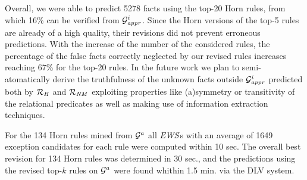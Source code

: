 


Overall, we were able to predict 5278 facts using the top-20 Horn rules, from which 16\% can be verified from $\mathcal{G}^i_{\mathit{appr}}$. Since the Horn versions  of the top-5 rules are already of a high quality, their revisions did not prevent erroneous predictions. With the increase of the number of the considered rules, the percentage of the false facts correctly neglected %
by our revised rules increases  reaching 67\% for the top-20 rules. 
In the future work we plan to semi-atomatically derive the truthfulness of the unknown facts outside $\mathcal{G}^i_{\mathit{appr}}$ predicted both by $\mathcal{R}_{\mathit{H}}$ and $\mathcal{R}_{\mathit{NM}}$ exploiting  properties like (a)symmetry or transitivity of the relational predicates as well as making use of information extraction techniques. %

For the 134 Horn rules mined from $\mathcal{G}^a$ all $\mathit{EWS}$s with an average of 1649 exception candidates for each rule were computed within 10 sec. The overall best revision for 134 Horn rules was determined in 30 sec., and the predictions using the revised top-$k$ rules on $\mathcal{G}^a$ were found whithin 1.5 min. via the DLV system. 


